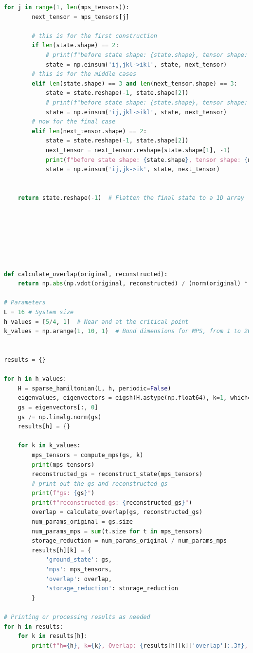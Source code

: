 \documentclass[12pt]{article}
\begin{document}
\begin{lstlisting}[language=Python]
    for j in range(1, len(mps_tensors)):
        next_tensor = mps_tensors[j]

        # this is for the first construction
        if len(state.shape) == 2:
            # print(f"before state shape: {state.shape}, tensor shape: {next_tensor.shape}")
            state = np.einsum('ij,jkl->ikl', state, next_tensor)
        # this is for the middle cases
        elif len(state.shape) == 3 and len(next_tensor.shape) == 3:
            state = state.reshape(-1, state.shape[2])
            # print(f"before state shape: {state.shape}, tensor shape: {next_tensor.shape}")
            state = np.einsum('ij,jkl->ikl', state, next_tensor)
        # now for the final case
        elif len(next_tensor.shape) == 2:
            state = state.reshape(-1, state.shape[2])
            next_tensor = next_tensor.reshape(state.shape[1], -1)
            print(f"before state shape: {state.shape}, tensor shape: {next_tensor.shape}")
            state = np.einsum('ij,jk->ik', state, next_tensor)
            

    return state.reshape(-1)  # Flatten the final state to a 1D array







def calculate_overlap(original, reconstructed):
    return np.abs(np.vdot(original, reconstructed) / (norm(original) * norm(reconstructed)))

# Parameters
L = 16 # System size
h_values = [5/4, 1]  # Near and at the critical point
k_values = np.arange(1, 10, 1)  # Bond dimensions for MPS, from 1 to 20 inclusive


results = {}

for h in h_values:
    H = sparse_hamiltonian(L, h, periodic=False)
    eigenvalues, eigenvectors = eigsh(H.astype(np.float64), k=1, which='SA')
    gs = eigenvectors[:, 0]
    gs /= np.linalg.norm(gs)
    results[h] = {}

    for k in k_values:
        mps_tensors = compute_mps(gs, k)
        print(mps_tensors)
        reconstructed_gs = reconstruct_state(mps_tensors)
        # print out the gs and reconstructed_gs
        print(f"gs: {gs}")
        print(f"reconstructed_gs: {reconstructed_gs}")
        overlap = calculate_overlap(gs, reconstructed_gs)
        num_params_original = gs.size
        num_params_mps = sum(t.size for t in mps_tensors)
        storage_reduction = num_params_original / num_params_mps
        results[h][k] = {
            'ground_state': gs,
            'mps': mps_tensors,
            'overlap': overlap,
            'storage_reduction': storage_reduction
        }

# Printing or processing results as needed
for h in results:
    for k in results[h]:
        print(f"h={h}, k={k}, Overlap: {results[h][k]['overlap']:.3f}, Storage Reduction: {results[h][k]['storage_reduction']:.3f}")

\end{lstlisting}
\newpage
\end{document}
